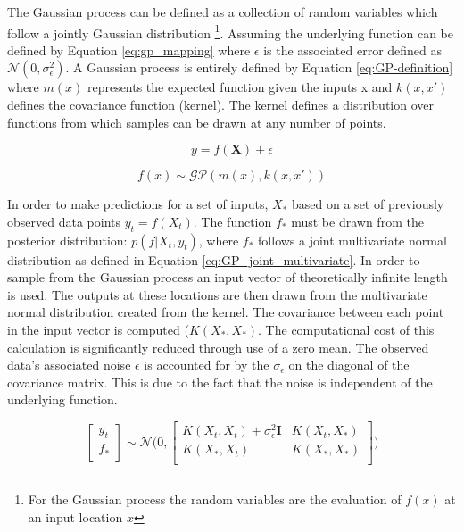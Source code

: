 \documentclass[a4paper, 10pt]{article}
\numberwithin{equation}{section}
\begin{document}
The Gaussian process can be defined as a collection of random variables which follow a jointly Gaussian distribution \footnote{For the Gaussian process the random variables are the evaluation of $f(x)$ at an input location $x$}. Assuming the underlying function can be defined by Equation \ref{eq:gp_mapping} where $\epsilon$ is the associated error defined as $\mathcal{N}(0,\sigma_\epsilon^2)$. A Gaussian process is entirely defined by Equation \ref{eq:GP-definition} where $m(x)$ represents the expected function given the inputs x and $k(x,x')$ defines the covariance function (kernel). The kernel defines a distribution over functions from which samples can be drawn at any number of points.


\begin{equation}
    \label{eq:gp_mapping}
    y = f(\mathbf{X})+ \epsilon
\end{equation}


\begin{equation}
    \label{eq:GP-definition}
    f(x) \sim \mathcal{GP}(m(x),k(x,x'))
\end{equation}



In order to make predictions for a set of inputs, $X_*$ based on a set of previously observed data points $y_t = f(X_t)$. The function $f_*$ must be drawn from the posterior distribution: $p(f|X_t,y_t)$, where $f_*$ follows a joint multivariate normal distribution as defined in Equation \ref{eq:GP_joint_multivariate}. In order to sample from the Gaussian process an input vector of theoretically infinite length is used. The outputs at these locations are then drawn from the multivariate normal distribution created from the kernel. The covariance between each point in the input vector is computed ($K(X_*,X_*)$. The computational cost of this calculation is significantly reduced through use of a zero mean. The observed data's associated noise $\epsilon$ is accounted for by the $\sigma_{\epsilon}$ on the diagonal of the covariance matrix. This is due to the fact that the noise is independent of the underlying function. 


\begin{equation}
    \label{eq:GP_joint_multivariate}
    \begin{bmatrix}
           y_{t} \\
           f_{*} \\
         \end{bmatrix} 
          \sim \mathcal{N}
    \Bigg( 0, \begin{bmatrix}
           K(X_t,X_t) + \sigma_{\epsilon}^2\mathbf{I} & K(X_t,X_*) \\
           K(X_*,X_t) & K(X_*,X_*) \\
         \end{bmatrix} \Bigg)
\end{equation}
\end{document}
